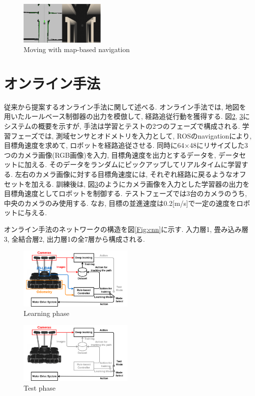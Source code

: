 \documentclass{ujarticle}
\begin{document}
\begin{figure}[h]
	\centering
	\includegraphics[width=0.37\textwidth]{img/navigation.png}
	\caption{Moving with map-based navigation}
	\label{Fig:navigation}
\end{figure}

\section{オンライン手法}%
従来から提案するオンライン手法に関して述べる. オンライン手法では, 地図を用いたルールベース制御器の出力を模倣して, 経路追従行動を獲得する. 図\ref{Fig:si2020-okada}, \ref{Fig:si2020-okada-test}にシステムの概要を示すが, 手法は学習とテストの2つのフェーズで構成される. 学習フェーズでは, 測域センサとオドメトリを入力として, ROSのnavigation\cite{navigation}により, 目標角速度を求めて, ロボットを経路追従させる. 同時に64×48にリサイズした3つのカメラ画像(RGB画像)を入力, 目標角速度を出力とするデータを, データセットに加える. そのデータをランダムにピックアップしてリアルタイムに学習する. 左右のカメラ画像に対する目標角速度には, それぞれ経路に戻るようなオフセットを加える. 訓練後は, 図\ref{Fig:si2020-okada-test}のようにカメラ画像を入力とした学習器の出力を目標角速度としてロボットを制御する. テストフェーズでは3台のカメラのうち, 中央のカメラのみ使用する. なお, 目標の並進速度は0.2[m/s]で一定の速度をロボットに与える. \par オンライン手法のネットワークの構造を図\ref{Fig:cnn}に示す. 入力層1, 畳み込み層3, 全結合層2, 出力層1の全7層から構成される.  

\begin{figure}[h]
	\centering
	\includegraphics[width=0.5\textwidth]{img/si2020-okada.png}
	\caption{Learning phase}
	\label{Fig:si2020-okada}
\end{figure}

\begin{figure}[h]
	\centering
	\includegraphics[width=0.5\textwidth]{img/si2020-okada-test.png}
	\caption{Test phase}
	\label{Fig:si2020-okada-test}
\end{figure}
\end{document}

